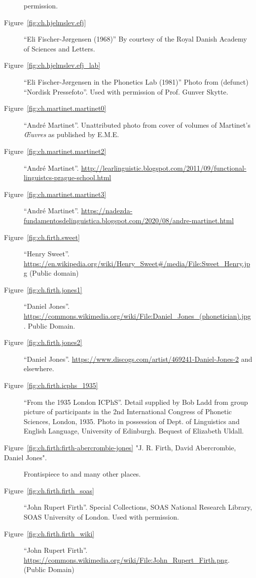 \begin{description}
  permission.
\item[Figure~\ref{fig:ch.hjelmslev.efj}] ``Eli Fischer-Jørgensen
  (1968)'' By courtesy of the Royal Danish Academy of Sciences and
  Letters.
\item[Figure~\ref{fig:ch.hjelmslev.efj_lab}] ``Eli Fischer-Jørgensen
  in the Phonetics Lab (1981)'' Photo from (defunct) ``Nordisk
  Pressefoto''. Used with permission of Prof. Gunver Skytte.
\item[Figure~\ref{fig:ch.martinet.martinet0}] ``André
  Martinet''. Unattributed photo from cover of volumes of Martinet's
  \textsl{Œuvres} as published by E.M.E.
\item[Figure~\ref{fig:ch.martinet.martinet2}] ``André Martinet''.
  \url{http://learlinguistic.blogspot.com/2011/09/functional-linguistcs-prague-school.html}
\item[Figure~\ref{fig:ch.martinet.martinet3}] ``André Martinet''.
  \url{https://nadezda-fundamentosdelinguistica.blogspot.com/2020/08/andre-martinet.html} 
\item[Figure~\ref{fig:ch.firth.sweet}] ``Henry
  Sweet''. \url{https://en.wikipedia.org/wiki/Henry_Sweet#/media/File:Sweet_Henry.jpg}
  (Public domain)
\item[Figure~\ref{fig:ch.firth.jones1}] ``Daniel
  Jones''. \url{https://commons.wikimedia.org/wiki/File:Daniel_Jones_(phonetician).jpg}. Public Domain.
\item[Figure~\ref{fig:ch.firth.jones2}] ``Daniel
  Jones''. \url{https://www.discogs.com/artist/469241-Daniel-Jones-2}
  and elsewhere.
\item[Figure~\ref{fig:ch.firth.icphs_1935}] ``From the 1935 London
  ICPhS''. Detail supplied by Bob Ladd from group picture of
  participants in the 2nd International Congress of Phonetic Sciences,
  London, 1935. Photo in possession of Dept. of Linguistics and
  English Language, University of Edinburgh. Bequest of Elizabeth
  Uldall.
\item[Figure~\ref{fig:ch.firth:firth-abercrombie-jones} "J. R. Firth,
  David Abercrombie, Daniel Jones".] Frontispiece to
  \citealt{asher.henderson81:hist.phonetics} and many other places.
\item[Figure~\ref{fig:ch.firth.firth_soas}] ``John Rupert
  Firth''. Special Collections, SOAS National Research Library, SOAS
  University of London. Used with permission.
\item[Figure~\ref{fig:ch.firth.firth_wiki}] ``John Rupert
  Firth''. \url{https://commons.wikimedia.org/wiki/File:John_Rupert_Firth.png}. (Public
  Domain) 

\end{description}
